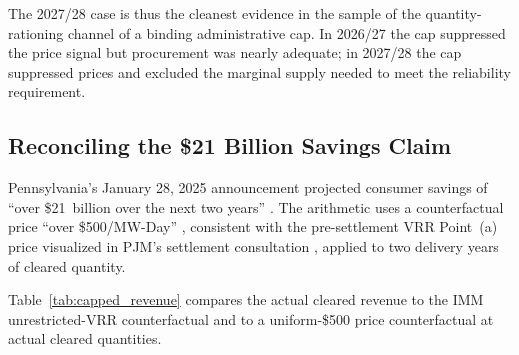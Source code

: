 The 2027/28 case is thus the cleanest evidence in the sample of the
quantity-rationing channel of a binding administrative cap. In
2026/27 the cap suppressed the price signal but procurement was
nearly adequate; in 2027/28 the cap suppressed prices and excluded
the marginal supply needed to meet the reliability requirement.

\subsection{Reconciling the \$21 Billion Savings Claim}
\label{subsec:21b_comparison}

Pennsylvania's January 28, 2025 announcement projected consumer savings
of ``over \$21~billion over the next two years''
\citep{Shapiro2025_press_release}. The arithmetic uses a counterfactual
price ``over \$500/MW-Day'' \citep{Shapiro2025_press_release},
consistent with the pre-settlement VRR Point~(a) price visualized in
PJM's settlement consultation \citep{PJM2025_settlement_slides}, applied
to two delivery years of cleared quantity.

Table~\ref{tab:capped_revenue} compares the actual cleared revenue to
the IMM unrestricted-VRR counterfactual and to a uniform-\$500 price
counterfactual at actual cleared quantities.

